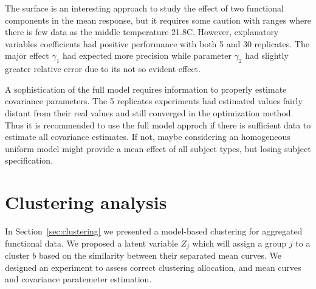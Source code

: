 The surface is an interesting approach to study the effect of two functional components in the mean response, but it requires some caution with ranges where there is few data as the middle temperature 21.8\textdegree C. However, explanatory variables coefficients had positive performance with both  5 and 30 replicates. The major effect $\gamma_1$ had expected more precision while parameter $\gamma_2$ had slightly greater relative error due to its not so evident effect.

A sophistication of the full model requires information to properly estimate covariance parameters. The 5 replicates experiments had estimated values fairly distant from their real values and still converged in the optimization method. Thus it is recommended to use the full model approch if there is sufficient data to estimate all covariance estimates. If not, maybe considering an homogeneous uniform model might provide a mean effect of all subject types, but losing subject specification.




































\section{Clustering analysis}
\label{sec:simu-cluster}

In Section~\ref{sec:clustering} we presented a model-based clustering for aggregated functional data. We proposed a latent variable $Z_j$ which will assign a group $j$ to a cluster $b$ based on the similarity between their separated mean curves. We designed an experiment to assess correct clustering allocation, and mean curves  and covariance paratemeter estimation.

